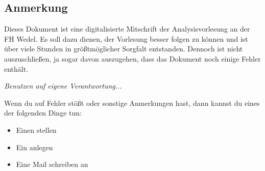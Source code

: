 \subsection*{Anmerkung}

Dieses Dokument ist eine digitalisierte Mitschrift der Analysisvorlesung an der FH Wedel. Es soll dazu dienen, der Vorlesung besser folgen zu können und ist über viele Stunden in größtmöglicher Sorgfalt entstanden. Dennoch ist nicht auszuschließen, ja sogar davon auszugehen, dass das Dokument noch einige Fehler enthält.

\bigskip
\textit{Benutzen auf eigene Verantwortung...}
\bigskip

Wenn du auf Fehler stößt oder sonstige Anmerkungen hast, dann kannst du eines der folgenden Dinge tun:
\begin{itemize}
    \item Einen  stellen
    \item Ein  anlegen
    \item Eine Mail schreiben an 
\end{itemize}
